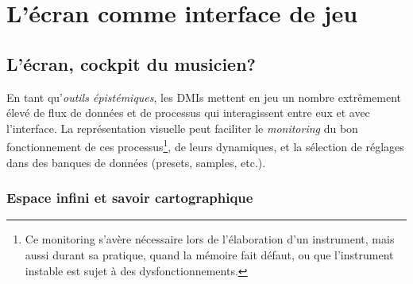 \section{L'écran comme interface de jeu}

\subsection{L'écran, cockpit du musicien?}

\noindent En tant qu'\textit{outils épistémiques}, les \glspl{DMI} mettent en jeu un nombre extrêmement élevé de flux de données et de processus qui interagissent entre eux et avec l'interface. La représentation visuelle peut faciliter le \textit{monitoring} du bon fonctionnement de ces processus\footnote{Ce monitoring s'avère nécessaire lors de l'élaboration d'un instrument, mais aussi durant sa pratique, quand la mémoire fait défaut, ou que l'instrument instable est sujet à des dysfonctionnements.}, de leurs dynamiques, et la sélection de réglages dans des banques de données (presets, samples, etc.).

\subsubsection{Espace infini et savoir cartographique} 

